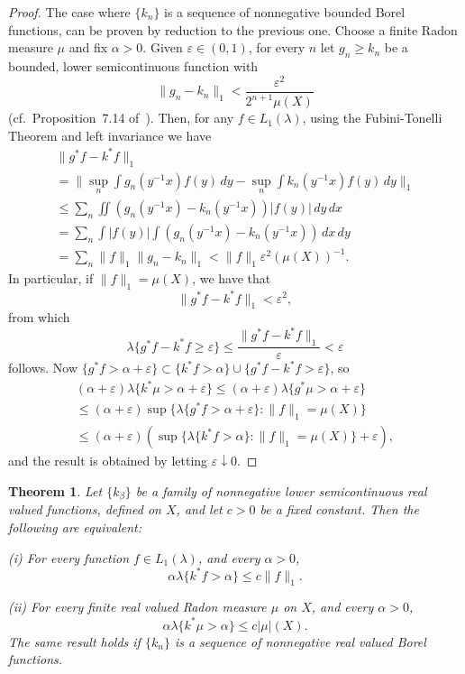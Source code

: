 \documentclass[12pt,a4paper]{amsart}
\newcommand{\ep}{\varepsilon}
\theoremstyle{plain}
\newtheorem{thm}{Theorem}
\theoremstyle{remark}
\begin{document}
\begin{proof}
The case where $\{k_n\}$ is a sequence of
nonnegative bounded Borel functions, can be proven by reduction
to the previous one. Choose a finite Radon measure $\mu$
and fix $\alpha > 0$.
Given $\ep \in (0, 1)$, for every $n$ let
$g_n \ge k_n$ be a bounded, lower semicontinuous function with
\[
    \| g_n - k_n \|_1 < \frac{\ep^2}{2^{n+1}\mu(X)}
\]
(cf.~Proposition~7.14 of~\cite{Fo}).
Then, for any $ f \in L_1(\lambda)$, using the Fubini-Tonelli Theorem and
left invariance we have
\begin{gather*}
    \| g^*f - k^*f \|_1
\\
    = \Big\| \sup_n \int g_n (y^{-1}x) f(y) \,dy
       - \sup_n \int k_n (y^{-1}x) f(y) \,dy \Big\|_1
\\
    \le \sum_n \iint (g_n (y^{-1}x) - k_n (y^{-1}x)) |f(y)| \,dy\,dx
\\
    = \sum_n \int |f(y)| \int (g_n (y^{-1}x) - k_n (y^{-1}x)) \,dx\,dy
\\
    = \sum_n \|f\|_1 \|g_n - k_n\|_1
    < \|f\|_1 \ep^2 (\mu(X))^{-1}.
\end{gather*}
In particular, if $\| f \|_1 = \mu(X)$,
we have that
\[
    \| g^*f - k^*f \|_1 < \ep^2,
\]
from which
\[
    \lambda \{g^*f - k^*f \ge \ep\}
    \le \frac{\| g^* f - k^* f\|_1}{\ep} < \ep
\]
follows.
Now
$\{g^* f > \alpha + \ep \} \subset \{k^* f > \alpha\} \cup
\{g^* f - k^* f > \ep\}$, so
\begin{gather*}
    (\alpha + \ep) \lambda \{ k^*\mu > \alpha + \ep \}
    \le (\alpha + \ep ) \lambda \{ g^*\mu > \alpha + \ep \}
\\
    \le (\alpha + \ep) \sup \{ \lambda \{g^*f > \alpha + \ep\}
      : \|f\|_1 = \mu(X) \}
\\
    \le (\alpha + \ep) ( \sup \{\lambda \{k^*f > \alpha\}
      : \|f\|_1 = \mu(X)\} + \ep ),
\end{gather*}
and the result is obtained by letting $\ep \downarrow 0$.
\end{proof}

\begin{thm}
\label{th:equiv}
Let $\{k_{\beta}\}$ be a family of
nonnegative lower semicontinuous real valued functions, defined on
$X$, and let $c>0$ be a fixed constant. Then the
following are equivalent:

(i) For every function $f\in L_1 (\lambda )$,
and every $\alpha > 0$,
\[
    \alpha \lambda \{k^*f > \alpha\} \le c \|f\|_1.
\]

(ii) For every finite real valued Radon measure $\mu$ on $X$,
and every $\alpha > 0$,
\[
    \alpha \lambda \{k^*\mu > \alpha\} \le c |\mu|(X).
\]
The same result holds if $\{k_{n}\}$ is a sequence of
nonnegative real valued Borel functions.
\end{thm}
\end{document}
